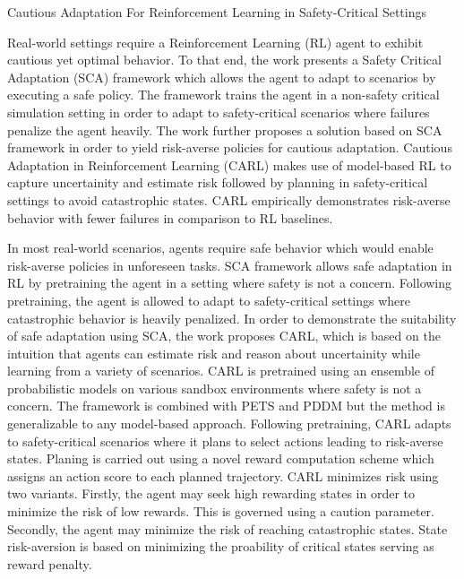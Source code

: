 \documentclass[11pt,letterpaper]{article}
\begin{document}
\begin{center}
  \large{Cautious Adaptation For Reinforcement Learning in Safety-Critical Settings}
\end{center}

Real-world settings require a Reinforcement Learning (RL) agent to exhibit cautious yet optimal behavior. To that end, the work presents a Safety Critical Adaptation (SCA) framework which allows the agent to adapt to scenarios by executing a safe policy. The framework trains the agent in a non-safety critical simulation setting in order to adapt to safety-critical scenarios where failures penalize the agent heavily. The work further proposes a solution based on SCA framework in order to yield risk-averse policies for cautious adaptation. Cautious Adaptation in Reinforcement Learning (CARL) makes use of model-based RL to capture uncertainity and estimate risk followed by planning in safety-critical settings to avoid catastrophic states. CARL empirically demonstrates risk-averse behavior with fewer failures in comparison to RL baselines. 

In most real-world scenarios, agents require safe behavior which would enable risk-averse policies in unforeseen tasks. SCA framework allows safe adaptation in RL by pretraining the agent in a setting where safety is not a concern. Following pretraining, the agent is allowed to adapt to safety-critical settings where catastrophic behavior is heavily penalized. In order to demonstrate the suitability of safe adaptation using SCA, the work proposes CARL, which is based on the intuition that agents can estimate risk and reason about uncertainity while learning from a variety of scenarios. CARL is pretrained using an ensemble of probabilistic models on various sandbox environments where safety is not a concern. The framework is combined with PETS and PDDM but the method is generalizable to any model-based approach. Following pretraining, CARL adapts to safety-critical scenarios where it plans to select actions leading to risk-averse states. Planing is carried out using a novel reward computation scheme which assigns an action score to each planned trajectory. CARL minimizes risk using two variants. Firstly, the agent may seek high rewarding states in order to minimize the risk of low rewards. This is governed using a caution parameter. Secondly, the agent may minimize the risk of reaching catastrophic states. State risk-aversion is based on minimizing the proability of critical states serving as reward penalty. 
\end{document}
